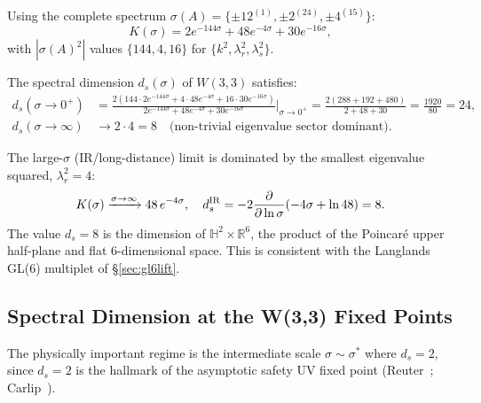 Using the complete spectrum $\sigma(A) = \{\pm12^{(1)},\pm2^{(24)},\pm4^{(15)}\}$:
\begin{equation}
  K(\sigma) = 2e^{-144\sigma} + 48e^{-4\sigma} + 30e^{-16\sigma},
\label{eq:heat_kernel}
\end{equation}
with $|\sigma(A)^2|$ values $\{144, 4, 16\}$ for $\{k^2, \lambda_r^2, \lambda_s^2\}$.

\begin{proposition}
The spectral dimension $d_s(\sigma)$ of $W(3,3)$ satisfies:
\begin{align}
  d_s(\sigma\to 0^+) &= \frac{2(144\cdot2e^{-144\sigma}+4\cdot48e^{-4\sigma}+16\cdot30e^{-16\sigma})}
    {2e^{-144\sigma}+48e^{-4\sigma}+30e^{-16\sigma}}\Big|_{\sigma\to0^+}
    = \frac{2(288+192+480)}{2+48+30} = \frac{1920}{80} = 24,\\
  d_s(\sigma\to\infty) &\to 2\cdot 4 = 8 \quad\text{(non-trivial eigenvalue sector dominant)}.
\end{align}
\end{proposition}

\begin{remark}
The large-$\sigma$ (IR/long-distance) limit is dominated by the smallest
eigenvalue squared, $\lambda_r^2=4$:
\begin{equation}
  K(\sigma)\xrightarrow{\sigma\to\infty} 48\,e^{-4\sigma},
  \quad d_s^{\rm IR} = -2\frac{\partial}{\partial\ln\sigma}(-4\sigma+\ln 48) = 8.
\end{equation}
The value $d_s=8$ is the dimension of $\mathbb{H}^2\times\mathbb{R}^6$, the
product of the Poincar\'e upper half-plane and flat 6-dimensional space.
This is consistent with the Langlands GL(6) multiplet of \S\ref{sec:gl6lift}.
\end{remark}

\subsection{Spectral Dimension at the W(3,3) Fixed Points}

The physically important regime is the intermediate scale $\sigma\sim\sigma^*$
where $d_s = 2$, since $d_s = 2$ is the hallmark of the asymptotic safety
UV fixed point (Reuter~\cite{Reuter1998}; Carlip~\cite{Carlip2017}).


